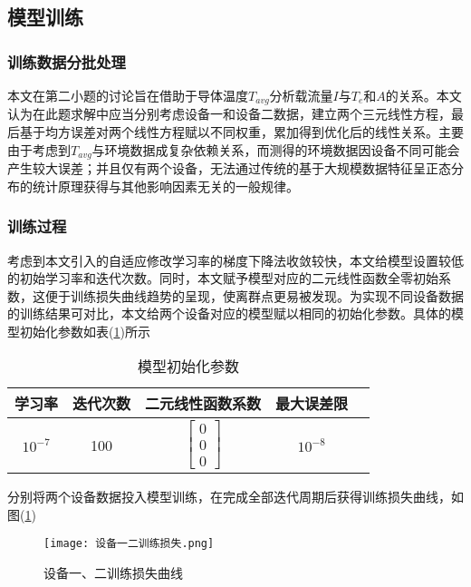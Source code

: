 \documentclass[withoutpreface,bwprint]{cumcmthesis}  %
\begin{document}
	\subsection{模型训练}
        \subsubsection{训练数据分批处理}
        本文在第二小题的讨论旨在借助于导体温度$T_{avg}$分析载流量$I$与$T_{e}$和$A$的关系。本文认为在此题求解中应当分别考虑设备一和设备二数据，建立两个三元线性方程，最后基于均方误差对两个线性方程赋以不同权重，累加得到优化后的线性关系。主要由于考虑到$T_{avg}$与环境数据成复杂依赖关系，而测得的环境数据因设备不同可能会产生较大误差；并且仅有两个设备，无法通过传统的基于大规模数据特征呈正态分布的统计原理获得与其他影响因素无关的一般规律。

        \subsubsection{训练过程}
        考虑到本文引入的自适应修改学习率的梯度下降法收敛较快，本文给模型设置较低的初始学习率和迭代次数。同时，本文赋予模型对应的二元线性函数全零初始系数，这便于训练损失曲线趋势的呈现，使离群点更易被发现。为实现不同设备数据的训练结果可对比，本文给两个设备对应的模型赋以相同的初始化参数。具体的模型初始化参数如表(\ref{tab:model_param})所示
        \vspace{16pt}
        \begin{table}[h] 
            \centering
            \caption{模型初始化参数} 
            \begin{tabular}{ccccc}  
                \toprule  
                    学习率 & 迭代次数 & 二元线性函数系数 & 最大误差限\\  
                \midrule  
                    $10^{-7}$ & 100 & $\begin{bmatrix}0\\0\\0\end{bmatrix}$ & $10^{-8}$ \\ 
                \bottomrule
            \end{tabular}  
            \label{tab:model_param}
        \end{table} 

        分别将两个设备数据投入模型训练，在完成全部迭代周期后获得训练损失曲线，如图(\ref{loss})
        \begin{figure}[H]
		\centering
		\texttt{[image: 设备一二训练损失.png]}
		\caption{设备一、二训练损失曲线}  %
		\label{loss}     %
	\end{figure}
\end{document}
